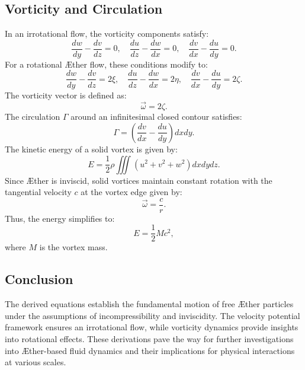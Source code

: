 \documentclass[a4paper,10pt]{article}
\begin{document}
    \subsection*{Vorticity and Circulation}
    In an irrotational flow, the vorticity components satisfy:
    \begin{equation*}
        \frac{dw}{dy} - \frac{dv}{dz} = 0, \quad \frac{du}{dz} - \frac{dw}{dx} = 0, \quad \frac{dv}{dx} - \frac{du}{dy} = 0.
    \end{equation*}
    For a rotational Æther flow, these conditions modify to:
    \begin{equation*}
        \frac{dw}{dy} - \frac{dv}{dz} = 2 \xi, \quad \frac{du}{dz} - \frac{dw}{dx} = 2 \eta, \quad \frac{dv}{dx} - \frac{du}{dy} = 2 \zeta.
    \end{equation*}
    The vorticity vector is defined as:
    \begin{equation*}
        \vec{\omega} = 2 \zeta.
    \end{equation*}
    The circulation $\Gamma$ around an infinitesimal closed contour satisfies:
    \begin{equation*}
        \Gamma = \left(\frac{dv}{dx} - \frac{du}{dy}\right) dx dy.
    \end{equation*}
    The kinetic energy of a solid vortex is given by:
    \begin{equation*}
        E = \frac{1}{2} \rho \iiint (u^2 + v^2 + w^2) dx dy dz.
    \end{equation*}
    Since Æther is inviscid, solid vortices maintain constant rotation with the tangential velocity $c$ at the vortex edge given by:
    \begin{equation*}
        \vec{\omega} = \frac{c}{r}.
    \end{equation*}
    Thus, the energy simplifies to:
    \begin{equation*}
        E = \frac{1}{2} M c^2,
    \end{equation*}
    where $M$ is the vortex mass.

    \subsection*{Conclusion}
    The derived equations establish the fundamental motion of free Æther particles under the assumptions of incompressibility and inviscidity. The velocity potential framework ensures an irrotational flow, while vorticity dynamics provide insights into rotational effects. These derivations pave the way for further investigations into Æther-based fluid dynamics and their implications for physical interactions at various scales.
\end{document}
